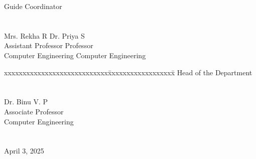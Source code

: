 \documentclass[11pt]{report}
\begin{document}
\begin{titlepage}
\begin{tabbing}
			Guide			\>				Coordinator
			\\
			\\
			\\
			Mrs. Rekha R \> Dr. Priya S\\
			Assistant Professor	\> Professor\\
			Computer Engineering	\>	Computer Engineering
		\end{tabbing}
		\vspace{.08in}
		\begin{tabbing}
			xxxxxxxxxxxxxxxxxxxxxxxxxxxx\= xxxxxxxxxxxxxxxxxx\= \kill
			\>Head of the Department \\
			\\
			\\
			\>Dr. Binu V. P\\
			\>Associate Professor\\
			\>Computer Engineering\\
                \\
                \\
                \>April 3, 2025
		\end{tabbing}
	\end{titlepage}
		
\end{document}
